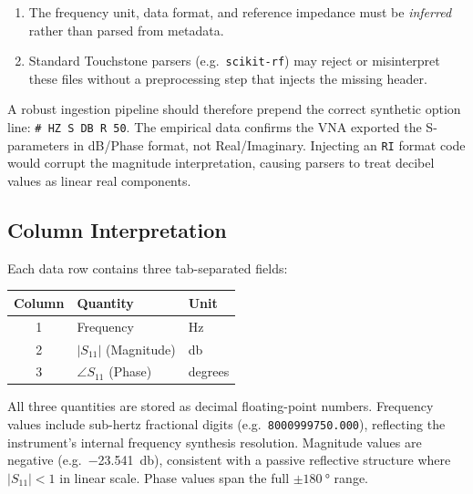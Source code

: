 \begin{enumerate}
    \item The frequency unit, data format, and reference impedance must
        be \emph{inferred} rather than parsed from metadata.
    \item Standard Touchstone parsers (e.g.\ \texttt{scikit-rf}) may
        reject or misinterpret these files without a preprocessing step
        that injects the missing header.
\end{enumerate}

\noindent
A robust ingestion pipeline should therefore prepend the correct
synthetic option line: \texttt{\# HZ S DB R 50}.  The empirical data
confirms the VNA exported the S-parameters in dB/Phase format, not
Real/Imaginary.  Injecting an \texttt{RI} format code would corrupt
the magnitude interpretation, causing parsers to treat decibel values
as linear real components.

\subsection{Column Interpretation}
\label{sec:dataset:columns}

Each data row contains three tab-separated fields:

\begin{center}
\begin{tabular}{cll}
    \toprule
    \textbf{Column} & \textbf{Quantity} & \textbf{Unit} \\
    \midrule
    1 & Frequency              & \si{\hertz} \\
    2 & $|S_{11}|$ (Magnitude) & \si{\decibel} \\
    3 & $\angle S_{11}$ (Phase) & degrees \\
    \bottomrule
\end{tabular}
\end{center}

\noindent
All three quantities are stored as decimal floating-point numbers.
Frequency values include sub-hertz fractional digits (e.g.\
\texttt{8000999750.000}), reflecting the instrument's internal frequency
synthesis resolution.
Magnitude values are negative (e.g.\ \SI{-23.541}{\decibel}),
consistent with a passive reflective structure where $|S_{11}| < 1$
in linear scale.  Phase values span the full
$\pm\SI{180}{\degree}$ range.

